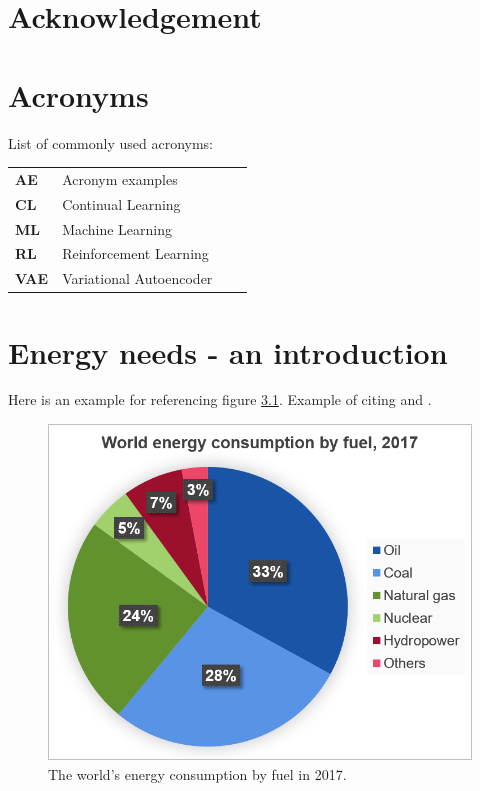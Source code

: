 \documentclass[electronic]{kthesis}
\begin{document}
	\chapter{Acknowledgement}
	\noindent \lipsum[1]
	
	\chapter{Acronyms}
	List of commonly used acronyms: \\
	
	\begin{tabular}{llll}
		\textbf{AE}		&	Acronym examples \\
		\textbf{CL}		& 	Continual Learning \\
		\textbf{ML}		& 	Machine Learning \\
		\textbf{RL}		& 	Reinforcement Learning \\
		\textbf{VAE}		&	Variational Autoencoder \\
		
	\end{tabular}
	
	
	\mainmatter %
	\tableofcontents
	
	\chapter{Energy needs - an introduction}
	\label{Intro}
	Here is an example for referencing figure \ref{EnergySources}. Example of citing \cite{BP2019} and \cite{Chen2016}.
	\begin{figure}[h]
		\centering
		\includegraphics[scale=0.6]{Figs/Ch1_EnergySources.png}
		\caption{The world's energy consumption by fuel in 2017. }
		\label{EnergySources}
	\end{figure}
	
\end{document}
